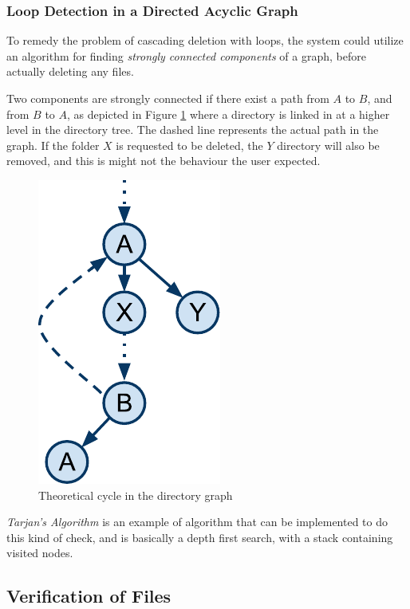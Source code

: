 \documentclass[pdftex,english,10pt,b5paper,twoside]{book}
\begin{document}
\subsubsection{Loop Detection in a Directed Acyclic Graph}

To remedy the problem of cascading deletion with loops, the system could
utilize an algorithm for finding \emph{strongly connected components} of a
graph, before actually deleting any files.

Two components are strongly connected if there exist a path from $A$ to $B$,
and from $B$ to $A$, as depicted in Figure \ref{fig:DSC:cycles} where a
directory is linked in at a higher level in the directory tree. The dashed line
represents the actual path in the graph. If the folder $X$ is requested to be
deleted, the $Y$ directory will also be removed, and this is might not the
behaviour the user expected.

\begin{figure}[h!]
    \centering
    \includegraphics[scale=0.6]{CyclesintheDAG.pdf}
    \caption{Theoretical cycle in the directory graph}
    \label{fig:DSC:cycles}
\end{figure}

\emph{Tarjan's Algorithm} \cite{tarjan} is an example of algorithm that can be
implemented to do this kind of check, and is basically a depth first search,
with a stack containing visited nodes.

\subsection{Verification of Files}
\end{document}
